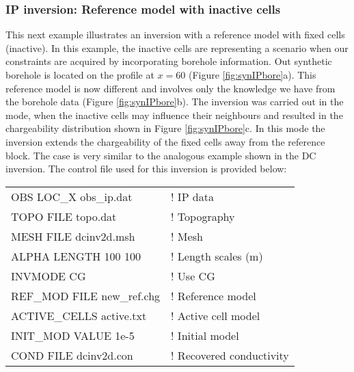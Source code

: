 \subsubsection{IP inversion: Reference model with inactive cells}
This next example illustrates an inversion with a reference model with fixed cells (inactive). In this example, the inactive cells are representing a scenario when our constraints are acquired by incorporating borehole information. Out synthetic borehole is located on the profile at $x=60$ (Figure \ref{fig:synIPbore}a). This reference model is now different and involves only the knowledge we have from the borehole data (Figure \ref{fig:synIPbore}b). The inversion was carried out in the mode, when the inactive cells may influence their neighbours and resulted in the chargeability distribution shown in Figure \ref{fig:synIPbore}c. In this mode the inversion extends the chargeability of the fixed cells away from the reference block. The case is very similar to the analogous example shown in the DC inversion. The control file used for this inversion is provided below:
%
\begin{fileExample}
\begin{tabular}{|ll|}
\hline
OBS LOC\_X obs\_ip.dat & ! IP data \\
TOPO FILE topo.dat & ! Topography\\
MESH FILE dcinv2d.msh & ! Mesh \\
ALPHA LENGTH 100 100 & ! Length scales (m) \\
INVMODE CG & ! Use CG \\
REF\_MOD FILE new\_ref.chg & ! Reference model \\
ACTIVE\_CELLS active.txt & ! Active cell model \\
INIT\_MOD VALUE 1e-5 & ! Initial model \\
COND FILE dcinv2d.con & ! Recovered conductivity \\
\hline
\end{tabular}
\end{fileExample}
%

